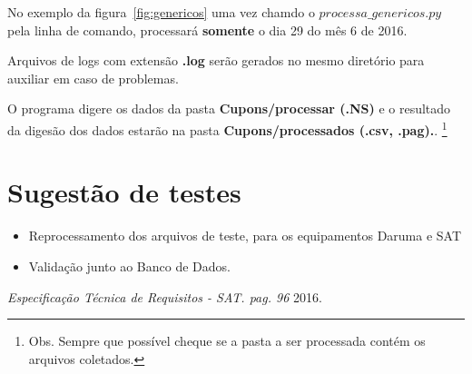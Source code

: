 \documentclass{article}      %
\begin{document}
No exemplo da figura~\ref{fig:genericos} uma vez chamdo o $processa\_genericos.py$ pela linha de comando, processará \textbf{somente} o dia 29 do mês 6 de 2016.

Arquivos de logs com extensão \textbf{.log} serão gerados no mesmo diretório para auxiliar em caso de problemas.

O programa digere os dados da pasta \textbf{Cupons/processar (.NS)} e o resultado da digesão dos dados estarão na pasta \textbf{Cupons/processados (.csv, .pag).}.  \footnote{Obs. Sempre que possível cheque se a pasta a ser processada contém os arquivos coletados.}



\section{Sugestão de testes}

\begin{itemize}
    \item Reprocessamento dos arquivos de teste, para os equipamentos Daruma e SAT 
    \item Validação junto ao Banco de Dados.
\end{itemize}

\begin{thebibliography}{1}
   {\em Especificação Técnica de Requisitos - SAT. pag. 96}  2016.
\end{thebibliography}
\end{document}
